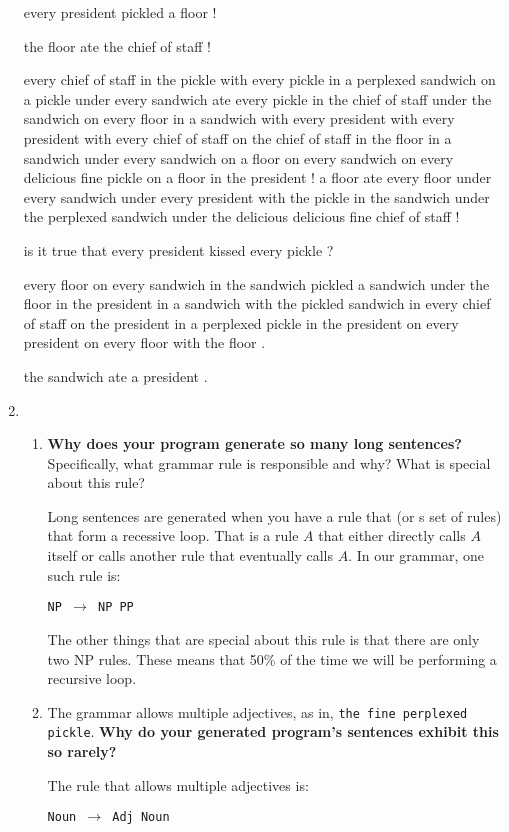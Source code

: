 \documentclass[10pt]{article}
\begin{document}
\begin{enumerate}
{every president pickled a floor !

the floor ate the chief of staff !

every chief of staff in the pickle with every pickle in a perplexed sandwich on a pickle under every sandwich ate every pickle in the chief of staff under the sandwich on every floor in a sandwich with every president with every president with every chief of staff on the chief of staff in the floor in a sandwich under every sandwich on a floor on every sandwich on every delicious fine pickle on a floor in the president !
a floor ate every floor under every sandwich under every president with the pickle in the sandwich under the perplexed sandwich under the delicious delicious fine chief of staff !

is it true that every president kissed every pickle ?

every floor on every sandwich in the sandwich pickled a sandwich under the floor in the president in a sandwich with the pickled sandwich in every chief of staff on the president in a perplexed pickle in the president on every president on every floor with the floor .

the sandwich ate a president .

}

\item\begin{enumerate}
\item {\bf Why does your program generate so many long sentences?}
    Specifically, what grammar rule is responsible and why? What is
    special about this rule?

Long sentences are generated when you have a rule that (or s set of rules) that form a recessive loop. That is a rule $A$ that either directly calls $A$ itself or calls another rule that eventually calls $A$. In our grammar, one such rule is:

{\tt NP $\rightarrow$ NP  PP}

The other things that are special about this rule is that there are only two NP rules. These means that 50\% of the time we will be performing a recursive loop.

\item The grammar allows multiple adjectives, as in, \verb|the fine perplexed pickle|. 
{\bf Why do your generated program's sentences exhibit this so rarely?}

The rule that allows multiple adjectives is:

{\tt Noun $\rightarrow$ Adj Noun}


\end{enumerate}
\end{enumerate}
\end{document}
